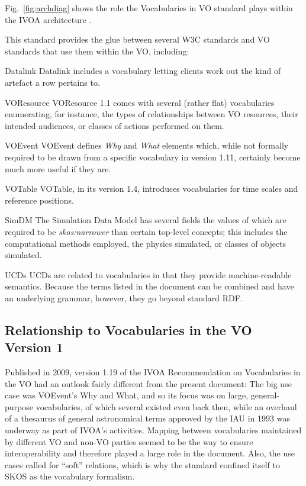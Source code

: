 \documentclass[11pt,a4paper]{ivoa}
\newcommand{\vocterm}[1]{\emph{\color{termcolor}#1}}
\begin{document}
Fig.~\ref{fig:archdiag} shows the role the Vocabularies in VO standard
plays within the IVOA architecture \citep{note:VOARCH}.

This standard provides the glue between several W3C standards and VO
standards that use them within the VO, including:

\begin{bigdescription}
\item[Datalink \citep{2015ivoa.spec.0617D}] Datalink includes a
vocabulary letting clients work out the kind of artefact a row pertains
to.

\item[VOResource \citep{2018ivoa.spec.0625P}] VOResource 1.1 comes with
several (rather flat) vocabularies enumerating, for instance, the types
of relationships between VO resources, their intended audiences, or
classes of actions performed on them.

\item[VOEvent \citep{2006ivoa.spec.1101S}] VOEvent defines \emph{Why}
and \emph{What} elements which, while not formally required to be drawn
from a specific vocabulary in version 1.11, certainly become much more
useful if they are.

\item[VOTable \citep{2019ivoa.spec.1021O}] VOTable, in its version 1.4,
introduces vocabularies for time scales and reference positions.

\item[SimDM \citep{2012ivoa.spec.0503L}] The Simulation Data Model has
several fields the values of which are required to be \vocterm{skos:narrower}
than certain top-level concepts; this includes the computational
methods employed, the physics simulated, or classes of objects
simulated.

\item[UCDs \citep{2007ivoa.spec.0402M}] UCDs are related to vocabularies in
that they provide machine-readable semantics.  Because the terms listed
in the document can be combined and have an underlying grammar, however,
they go beyond standard RDF.
\end{bigdescription}

\subsection{Relationship to Vocabularies in the VO Version 1}

Published in 2009, version 1.19 of the IVOA Recommendation on
Vocabularies in the VO had an outlook fairly different from the present
document: The big use case was VOEvent's Why and What, and so its focus
was on large, general-purpose vocabularies, of which several existed even
back then, while an overhaul of a thesaurus of general astronomical
terms approved by the IAU in 1993 was underway as part of IVOA's
activities.  Mapping between vocabularies maintained by different VO
and non-VO parties seemed to be the way to ensure interoperability and
therefore played a large role in the document.  Also, the use cases
called for ``soft'' relations, which is why the standard confined itself
to SKOS as the vocabulary formalism.
\end{document}
